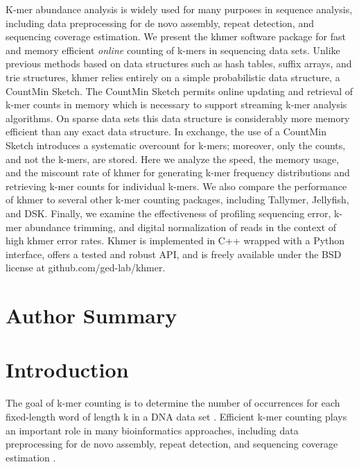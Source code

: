 \documentclass[10pt]{article}
\begin{document}
K-mer abundance analysis is widely used for many purposes in sequence
analysis, including data preprocessing for de novo assembly, repeat
detection, and sequencing coverage estimation.
We present the khmer software package for fast and memory efficient
{\em online} counting of k-mers in sequencing
data sets. Unlike previous methods based on data structures such as
hash tables, suffix arrays, and trie structures, khmer relies entirely
on a simple probabilistic data structure, a CountMin Sketch.  The
CountMin Sketch permits online updating and retrieval of k-mer counts
in memory which is necessary to support streaming k-mer analysis algorithms.
On sparse data sets this data structure is considerably more memory
efficient than any exact data structure.  In exchange, the use of a
CountMin Sketch introduces a systematic overcount for k-mers;
moreover, only the counts, and not the k-mers, are stored.
Here we analyze the speed, the memory usage, and the miscount rate of khmer
for generating k-mer frequency distributions and retrieving k-mer
counts for individual k-mers.  We also compare the performance of
khmer to several other k-mer counting packages, including Tallymer,
Jellyfish, and DSK.  Finally, we examine the effectiveness of profiling 
sequencing error, k-mer abundance trimming, and
digital normalization of reads in the context of high khmer error
rates. Khmer is implemented in C++ wrapped with a Python
interface, offers a tested and robust API, and is freely available
under the BSD license at github.com/ged-lab/khmer.

\section*{Author Summary}

\section*{Introduction}

The goal of k-mer counting is to determine the number of occurrences
for each fixed-length word of length k in a DNA data set
\cite{Marcais2011}. Efficient k-mer counting plays an important role
in many bioinformatics approaches, including data preprocessing for de
novo assembly, repeat detection, and sequencing coverage estimation
\cite{Kurtz2008}.
\end{document}
